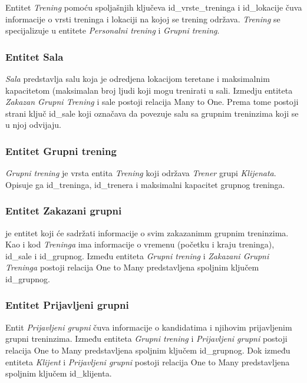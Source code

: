 \documentclass[../main.tex]{subfiles}
\begin{document}
Entitet \textit{Trening} pomoću spoljašnjih ključeva id\_vrste\_treninga i id\_lokacije čuva informacije o vrsti treninga i lokaciji na kojoj se trening održava. \textit{Trening} se specijalizuje u entitete \textit{Personalni trening} i \textit{Grupni trening}.


\subsubsection{Entitet Sala}

\textit{Sala} predstavlja salu koja je odredjena lokacijom teretane i maksimalnim kapacitetom (maksimalan broj ljudi koji mogu trenirati u sali. Izmedju entiteta  \textit{Zakazan Grupni Trening} i sale postoji relacija Many to One. Prema tome postoji strani ključ id\_sale koji označava da povezuje salu sa grupnim treninzima koji se u njoj odvijaju. 

\subsubsection{Entitet Grupni trening}
\textit{Grupni trening} je vrsta entita \textit{Trening} koji održava \textit{Trener} grupi \textit{Klijenata}. Opisuje ga id\_treninga, id\_trenera i maksimalni kapacitet grupnog treninga.

\subsubsection{Entitet Zakazani grupni} je entitet koji će sadržati informacije o svim zakazanimm grupnim treninzima. Kao i kod \textit{Treninga} ima informacije o vremenu (početku i kraju treninga), id\_sale i id\_grupnog. Između entiteta \textit{Grupni trening} i \textit{Zakazani Grupni Treninga} postoji relacija One to Many predstavljena spoljnim ključem id\_grupnog.

\subsubsection{Entitet Prijavljeni grupni} 

Entit \textit{Prijavljeni grupni} čuva informacije o kandidatima i njihovim prijavljenim grupni treninzima. Između entiteta \textit{Grupni trening} i \textit{Prijavljeni grupni} postoji relacija One to Many predstavljena spoljnim ključem id\_grupnog. Dok između entiteta \textit{Klijent} i \textit{Prijavljeni grupni} postoji relacija One to Many predstavljena spoljnim ključem id\_klijenta.
\end{document}
